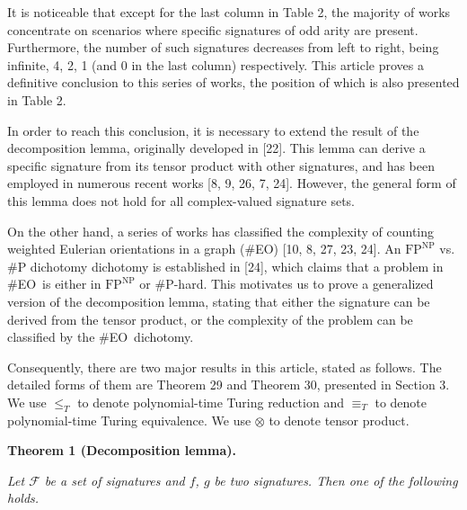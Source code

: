 It is noticeable that except for the last column in Table 2, the majority of works concentrate on scenarios where specific signatures of odd arity are present. Furthermore, the number of such signatures decreases from left to right, being infinite, 4, 2, 1 (and 0 in the last column) respectively. This article proves a definitive conclusion to this series of works, the position of which is also presented in Table 2.\par




In order to reach this conclusion, it is necessary to extend the result of the decomposition lemma, originally developed in [22]. This lemma can derive a specific signature from its tensor product with other signatures, and has been employed in numerous recent works [8, 9, 26, 7, 24]. However, the general form of this lemma does not hold for all complex-valued signature sets.\par




On the other hand, a series of works has classified the complexity of counting weighted Eulerian orientations in a graph (\#EO) [10, 8, 27, 23, 24]. An $\text{FP}^{\text{NP}}$ vs. \#P dichotomy dichotomy is established in [24], which claims that a problem in \#EO is either in $\text{FP}^{\text{NP}}$ or \#P-hard.
This motivates us to prove a generalized version of the decomposition lemma, stating that either the signature can be derived from the tensor product, or the complexity of the problem can be classified by the \#EO dichotomy.\par




Consequently, there are two major results in this article, stated as follows. The detailed forms of them are Theorem 29 and Theorem 30, presented in Section 3. We use $\leq_{T}$ to denote polynomial-time Turing reduction and $\equiv_{T}$ to denote polynomial-time Turing equivalence. We use $\otimes$ to denote tensor product.\par





\par\medskip\noindent\textbf{
\textbf{Theorem 1}\textbf{ }(Decomposition lemma)\textbf{.}
}\par



\emph{Let $\mathcal{F}$ be a set of signatures and $f$, $g$ be two signatures. Then one of the following holds.}\par


